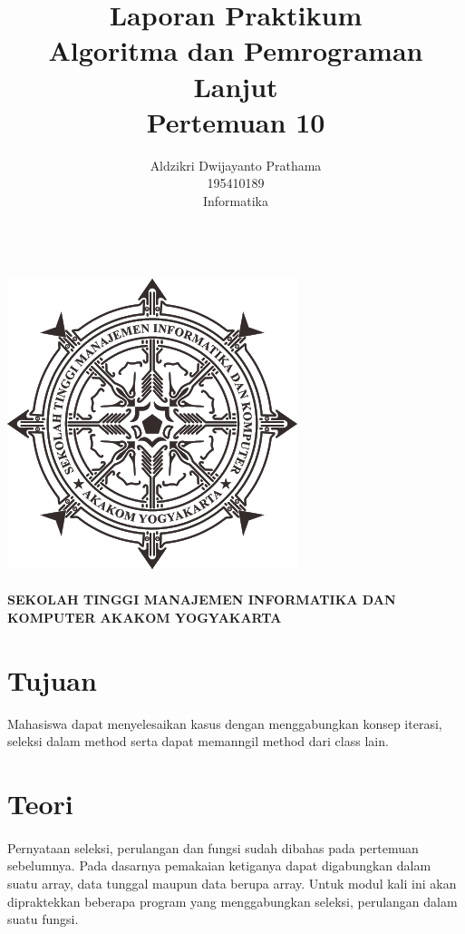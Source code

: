 \documentclass[a4paper,12pt]{article}
\begin{document}
\title{ {\Large Laporan Praktikum}\\ Algoritma dan Pemrograman Lanjut\\{\Large Pertemuan 10}}

\author{Aldzikri Dwijayanto Prathama
    \\195410189
    \\Informatika}
\makeatletter
\begin{titlepage}
    \begin{center}
        {\huge \bfseries \@title}\\[14ex]
        \includegraphics[scale=.8]{logo}\\[4ex]
        {\large \@author}\\[12ex]
        {\large \bfseries {SEKOLAH TINGGI MANAJEMEN INFORMATIKA DAN KOMPUTER
            AKAKOM YOGYAKARTA}}
    \end{center}


\end{titlepage}
\makeatother
\newpage
\tableofcontents
\newpage

\section{Tujuan}
Mahasiswa dapat menyelesaikan kasus dengan menggabungkan konsep iterasi, seleksi dalam method serta dapat memanngil
method dari class lain.
\section{Teori}
\paragraph{}
Pernyataan seleksi, perulangan dan fungsi sudah dibahas pada pertemuan sebelumnya.
Pada dasarnya pemakaian ketiganya dapat digabungkan dalam suatu array, data tunggal maupun data berupa array.
Untuk modul kali ini akan dipraktekkan beberapa program yang menggabungkan seleksi, perulangan dalam suatu fungsi.
\newpage
\end{document}
